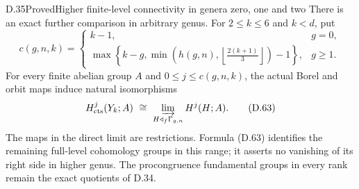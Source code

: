\begin{result}{D.35}{Proved}{Higher finite-level connectivity in genera zero, one and two}
There is an exact further comparison in arbitrary genus.  For
$2\leq k\leq6$ and $k<d$, put
\[
c(g,n,k)=
\begin{cases}
k-1,&g=0,\\
\displaystyle\max\left\{k-g,
 \min\left(h(g,n),\left\lfloor\frac{2(k+1)}3\right\rfloor\right)-1
 \right\},&g\geq1.
\end{cases}                                                     \tag{D.62}
\]
For every finite abelian group $A$ and $0\leq j\leq c(g,n,k)$,
the actual Borel and orbit maps induce natural isomorphisms
\[
 H^j_{\rm cts}(Y_k;A)
       \ \cong\ \varinjlim_{H\triangleleft_f\Gamma_{g,n}}
                         H^j(H;A).                              \tag{D.63}
\]
The maps in the direct limit are restrictions.  Formula (D.63)
identifies the remaining full-level cohomology groups in this
range; it asserts no vanishing of its right side in higher genus.
The procongruence fundamental groups in every rank remain the
exact quotients of D.34.
\end{result}
